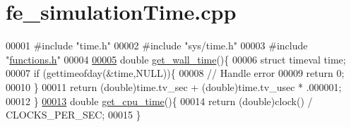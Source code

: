\hypertarget{fe__simulation_time_8cpp_source}{}\section{fe\+\_\+simulation\+Time.\+cpp}
\label{fe__simulation_time_8cpp_source}

\begin{DoxyCode}
00001 \textcolor{preprocessor}{#include "time.h"}
00002 \textcolor{preprocessor}{#include "sys/time.h"}
00003 \textcolor{preprocessor}{#include "\hyperlink{functions_8h}{functions.h}"}
00004 
\hyperlink{fe__simulation_time_8cpp_ae9530b09b27f0c6e5c8836ecbfad493f}{00005} \textcolor{keywordtype}{double} \hyperlink{fe__simulation_time_8cpp_ae9530b09b27f0c6e5c8836ecbfad493f}{get\_wall\_time}()\{
00006     \textcolor{keyword}{struct }timeval time;
00007     \textcolor{keywordflow}{if} (gettimeofday(&time,NULL))\{
00008         \textcolor{comment}{//  Handle error}
00009         \textcolor{keywordflow}{return} 0;
00010     \}
00011     \textcolor{keywordflow}{return} (\textcolor{keywordtype}{double})time.tv\_sec + (double)time.tv\_usec * .000001;
00012 \}
\hyperlink{fe__simulation_time_8cpp_acdbcf9be8c879dddacc5aed7d31d7c84}{00013} \textcolor{keywordtype}{double} \hyperlink{fe__simulation_time_8cpp_acdbcf9be8c879dddacc5aed7d31d7c84}{get\_cpu\_time}()\{
00014     \textcolor{keywordflow}{return} (\textcolor{keywordtype}{double})clock() / CLOCKS\_PER\_SEC;
00015 \}
\end{DoxyCode}
